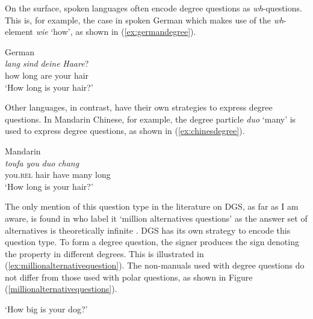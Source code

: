 On the surface, spoken languages often encode degree questions as \textit{wh}-ques\-tions. This is, for example, the case in spoken German which makes use of the \textit{wh}-element \textit{wie} `how', as shown in (\ref{ex:germandegree}). 

\begin{exe}
\ex German \\  {\textit{lang}} {\textit{sind}} {\textit{deine}} {\textit{Haare}?} \\
{how} {long} {are} {your} {hair} \\
\trans `How long is your hair?' \label{ex:germandegree}
\end{exe} 


\noindent Other languages, in contrast, have their own strategies to express degree questions. In Mandarin Chinese, for example, the degree particle \textit{duo} `many' is used to express degree questions, as shown in (\ref{ex:chinesdegree}).


\begin{exe}
\ex Mandarin \\  {\textit{toufa}} {\textit{you}} {\textit{duo}} {\textit{chang}} \\
{you.\textsc{rel}} {hair} {have} {many} {long} \\
\trans `How long is your hair?' \label{ex:chinesdegree}
\end{exe} 

\noindent The only mention of this question type in the literature on DGS, as far as I am aware, is found in \citet[335]{happ2014vork} who label it `million alternatives questions' as the answer set of alternatives is theoretically infinite \citep{fox2006universal}. DGS has its own strategy to encode this question type. To form a degree question, the signer produces the sign denoting the property in different degrees. This is illustrated in (\ref{ex:millionalternativequestion}). The non-manuals used with degree questions do not differ from those used with polar questions, as shown in Figure (\ref{millionalternativequestions}).

\begin{exe}
\ex {}
\glt `How big is your dog?' \label{ex:millionalternativequestion}
\end{exe}


